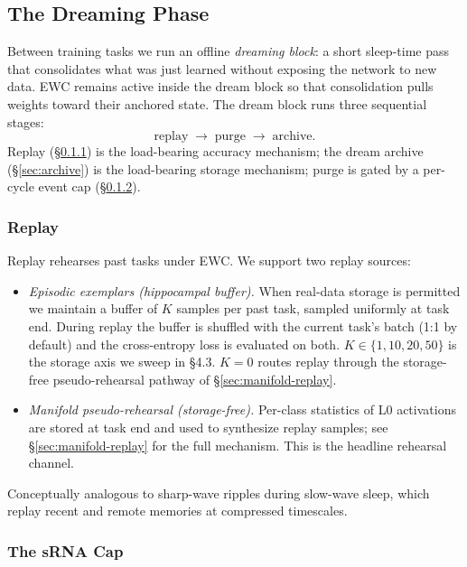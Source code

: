 \documentclass[11pt]{article}
\begin{document}
\subsection{The Dreaming Phase}
\label{sec:dreaming-phase}

Between training tasks we run an offline \emph{dreaming block}: a short
sleep-time pass that consolidates what was just learned without exposing
the network to new data. EWC remains active inside the dream block so
that consolidation pulls weights toward their anchored state. The dream
block runs three sequential stages:
\begin{equation*}
  \text{replay} \;\to\; \text{purge} \;\to\; \text{archive}.
\end{equation*}
Replay (\S\ref{sec:replay}) is the load-bearing accuracy mechanism; the
dream archive (\S\ref{sec:archive}) is the load-bearing storage
mechanism; purge is gated by a per-cycle event cap
(\S\ref{sec:srna-cap}).

\subsubsection{Replay}
\label{sec:replay}

Replay rehearses past tasks under EWC. We support two replay sources:
\begin{itemize}[leftmargin=1.5em]
  \item \emph{Episodic exemplars (hippocampal buffer).} When real-data
        storage is permitted we maintain a buffer of $K$ samples per past
        task, sampled uniformly at task end. During replay the buffer is
        shuffled with the current task's batch (1{:}1 by default) and the
        cross-entropy loss is evaluated on both. $K \in \{1, 10, 20, 50\}$
        is the storage axis we sweep in \S4.3. $K = 0$ routes replay
        through the storage-free pseudo-rehearsal pathway of
        \S\ref{sec:manifold-replay}.
  \item \emph{Manifold pseudo-rehearsal (storage-free).} Per-class
        statistics of L0 activations are stored at task end and used to
        synthesize replay samples; see \S\ref{sec:manifold-replay} for the
        full mechanism. This is the headline rehearsal channel.
\end{itemize}
Conceptually analogous to sharp-wave ripples during slow-wave sleep, which
replay recent and remote memories at compressed timescales.

\subsubsection{The sRNA Cap}
\label{sec:srna-cap}
\end{document}

